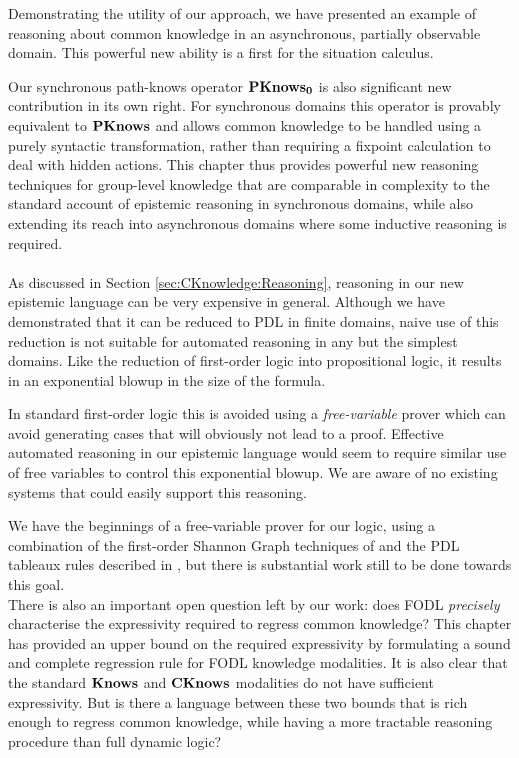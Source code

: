 Demonstrating the utility of our approach, we have presented an example
of reasoning about common knowledge in an asynchronous, partially
observable domain. This powerful new ability is a first for the situation
calculus.

Our synchronous path-knows operator $\mathbf{PKnows_{0}}$ is also significant
new contribution in its own right. For synchronous domains this operator
is provably equivalent to $\mathbf{PKnows}$ and allows common knowledge to
be handled using a purely syntactic transformation, rather than requiring
a fixpoint calculation to deal with hidden actions. This chapter thus
provides powerful new reasoning techniques for group-level knowledge
that are comparable in complexity to the standard account of epistemic
reasoning in synchronous domains, while also extending its reach into
asynchronous domains where some inductive reasoning is required. \\
\\


As discussed in Section \ref{sec:CKnowledge:Reasoning}, reasoning
in our new epistemic language can be very expensive in general. Although
we have demonstrated that it can be reduced to PDL in finite domains,
naive use of this reduction is not suitable for automated reasoning
in any but the simplest domains. Like the reduction of first-order
logic into propositional logic, it results in an exponential blowup
in the size of the formula.

In standard first-order logic this is avoided using a \emph{free-variable}
prover which can avoid generating cases that will obviously not lead
to a proof. Effective automated reasoning in our epistemic language
would seem to require similar use of free variables to control this
exponential blowup. We are aware of no existing systems that could
easily support this reasoning.

We have the beginnings of a free-variable prover for our logic, using
a combination of the first-order Shannon Graph techniques of \citep{Posegga95shannong_graphs}
and the PDL tableaux rules described in \citep{abate07twb_pdl}, but
there is substantial work still to be done towards this goal.\\


There is also an important open question left by our work: does FODL
\emph{precisely} characterise the expressivity required to regress
common knowledge? This chapter has provided an upper bound on the
required expressivity by formulating a sound and complete regression
rule for FODL knowledge modalities. It is also clear that the standard
$\mathbf{Knows}$ and $\mathbf{CKnows}$ modalities do not have sufficient expressivity.
But is there a language between these two bounds that is rich enough
to regress common knowledge, while having a more tractable reasoning
procedure than full dynamic logic?

